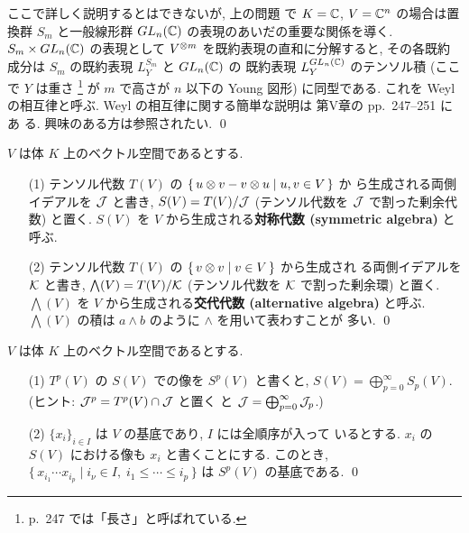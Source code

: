 \documentclass[12pt,twoside]{jarticle}
\begin{document}
\begin{guide}\label{guide:Weyl-reciprocity}
  ここで詳しく説明するとはできないが, 
  上の問題 
  で $K={\mathbb C}$, $V={\mathbb C}^n$ の場合は置換群 $S_m$ と一般線形群 $GL_n({\mathbb C})$ 
  の表現のあいだの重要な関係を導く. 
  $S_m\times GL_n({\mathbb C})$ の表現として $V^{\otimes m}$ を既約表現の直和に分解すると,
  その各既約成分は $S_m$ の既約表現 $L^{S_m}_Y$ と $GL_n({\mathbb C})$ の
  既約表現 $L^{GL_n({\mathbb C})}_Y$ のテンソル積 (ここで $Y$ は重さ%
  \footnote{\cite{satake} p.~247 では「長さ」と呼ばれている.} %
  が $m$ で高さが $n$ 以下の Young 図形) に同型である.  
  これを Weyl の相互律と呼ぶ.   
  Weyl の相互律に関する簡単な説明は \cite{satake} 第V章の pp.~247--251 にあ
  る.  興味のある方は参照されたい.  \qed
\end{guide}

\begin{definition}[対称代数と交代代数]
  $V$ は体 $K$ 上のベクトル空間であるとする. 
  \begin{itemize}
  \item[(1)] テンソル代数 $T(V)$ の $\{\,u\otimes v - v\otimes u\mid u,v\in V\,\}$ か
    ら生成される両側イデアルを ${\mathcal J}$ と書き, 
    $S(V)=T(V)/{\mathcal J}$ (テンソル代数を ${\mathcal J}$ で割った剰余代数) と置く.  
    $S(V)$ を $V$ から生成される{\bf 対称代数 (symmetric algebra)} と呼ぶ.
  \item[(2)] テンソル代数 $T(V)$ の $\{\,v\otimes v \mid v\in V\,\}$ から生成され
    る両側イデアルを ${\mathcal K}$ と書き, $\bigwedge(V)=T(V)/{\mathcal K}$ 
    (テンソル代数を ${\mathcal K}$ で割った剰余環) と置く.  
    $\bigwedge(V)$ を $V$ から生成される{\bf 交代代数 (alternative algebra)} 
    と呼ぶ. 
    $\bigwedge(V)$ の積は $a\wedge b$ のように $\wedge$ を用いて表わすことが
    多い. \qed
  \end{itemize}
\end{definition}

\begin{question}
  $V$ は体 $K$ 上のベクトル空間であるとする.
  \begin{itemize}
  \item[(1)] $T^p(V)$ の $S(V)$ での像を $S^p(V)$ と書くと,
    $S(V) = \bigoplus_{p=0}^\infty S_p(V)$.
    (ヒント: ${\mathcal J}^p=T^p(V)\cap{\mathcal J}$ と置く
    と ${\mathcal J}=\bigoplus_{p=0}^\infty {\mathcal J}_p$.)
  \item[(2)] $\{x_i\}_{i\in I}$ は $V$ の基底であり, $I$ には全順序が入って
    いるとする. $x_i$ の $S(V)$ における像も $x_i$ と書くことにする.
    このとき, $\{\,x_{i_1}\cdots x_{i_p}\mid 
    i_\nu\in I,\; i_1\le\cdots\le i_p\,\}$ は $S^p(V)$ の基底である.
    \qed
  \end{itemize}
\end{question}
\end{document}
